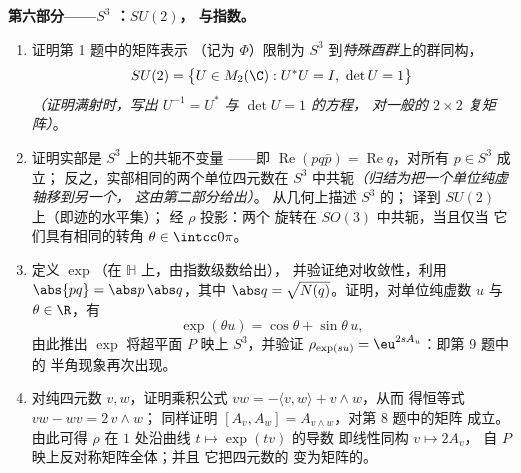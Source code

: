 \begin{problem}
\medskip
\noindent\textbf{第六部分——$S^3$ ：$SU(2)$，
与指数。}
\begin{enumerate}[resume]
  \item 证明第 1 题中的矩阵表示
        （记为 $\Phi$）限制为
        $S^3$ 到\emph{特殊酉群}上的群同构，
        \[
        SU(2) = \bigl\{U \in M_2(\C) : U^*U = I,\ \det U =
        1\bigr\}
        \]
        \emph{（证明满射时，写出
        $U^{-1} = U^*$ 与 $\det U = 1$ 的方程，
        对一般的 $2\times2$ 复矩阵）}。
  \item 证明实部是 $S^3$ 上的共轭不变量
——即 $\operatorname{Re}(pq\bar p) =
        \operatorname{Re}q$，对所有 $p \in S^3$ 成立；
        反之，实部相同的两个单位四元数在
        $S^3$ 中共轭\emph{（归结为把一个单位纯虚轴移到另一个，
        这由第二部分给出）}。
        从几何上描述 $S^3$ 的；
        译到 $SU(2)$ 上（即迹的水平集）；
        经 $\rho$ 投影：两个
        旋转在 $SO(3)$ 中共轭，当且仅当
        它们具有相同的转角 $\theta \in \intcc0\pi$。
  \item 定义 $\exp$（在 $\mathbb H$ 上，由指数级数给出），
        并验证绝对收敛性，利用
        $\abs{pq} = \abs p\,\abs q$，其中 $\abs q =
        \sqrt{N(q)}$。证明，对单位纯虚数 $u$ 与 $\theta
        \in \R$，有
        \[
        \exp(\theta u) = \cos\theta + \sin\theta\,u ,
        \]
        由此推出 $\exp$ 将超平面 $P$
        映上 $S^3$，并验证 $\rho_{\exp(su)} =
        \eu^{2sA_u}$：即第 9 题中的
        半角现象再次出现。
  \item 对纯四元数 $v, w$，证明乘积公式
        $vw = -\langle v, w\rangle + v\wedge w$，从而
        得恒等式 $vw - wv = 2\,v\wedge w$；
        同样证明 $[A_v, A_w] = A_{v\wedge w}$，对第 8 题中的矩阵
        成立。由此可得
        $\rho$ 在 $1$ 处沿曲线 $t \mapsto \exp(tv)$ 的导数
        即线性同构 $v \mapsto 2A_v$，
        自 $P$ 映上反对称矩阵全体；并且
        它把四元数的
        变为矩阵的。
\end{enumerate}


\end{problem}
